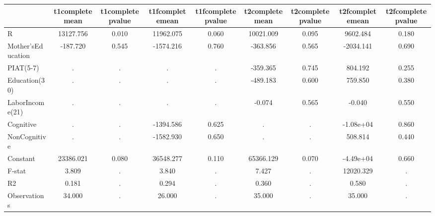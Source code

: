 \begin{table}[htbp]
\begin{tabular}{lcccccccc} \hline \hline
 & t1completemean  & t1completepvalue  & t1fcompletemean  & t1fcompletepvalue  & t2completemean  & t2completepvalue  & t2fcompletemean  & t2fcompletepvalue  \\  \hline 
R & 13127.756 &     0.010 & 11962.075 &     0.060 & 10021.009 &     0.095 &  9602.484 &     0.180 \\  
Mother'sEducation &  -187.720 &     0.545 & -1574.216 &     0.760 &  -363.856 &     0.565 & -2034.141 &     0.690 \\  
PIAT(5-7) &         . &         . &         . &         . &  -359.365 &     0.745 &   804.192 &     0.255 \\  
Education(30) &         . &         . &         . &         . &  -489.183 &     0.600 &   759.850 &     0.380 \\  
LaborIncome(21) &         . &         . &         . &         . &    -0.074 &     0.565 &    -0.040 &     0.550 \\  
Cognitive &         . &         . & -1394.586 &     0.625 &         . &         . & -1.08e+04 &     0.860 \\  
NonCognitive &         . &         . & -1582.930 &     0.650 &         . &         . &   508.814 &     0.440 \\  
Constant & 23386.021 &     0.080 & 36548.277 &     0.110 & 65366.129 &     0.070 & -4.49e+04 &     0.660 \\  
F-stat &     3.809 &         . &     3.840 &         . &     7.427 &         . & 12020.329 &         . \\  
R2 &     0.181 &         . &     0.294 &         . &     0.360 &         . &     0.580 &         . \\  
Observations &    34.000 &         . &    26.000 &         . &    35.000 &         . &    35.000 &         . \\  
\hline \hline \end{tabular}
\end{table}
